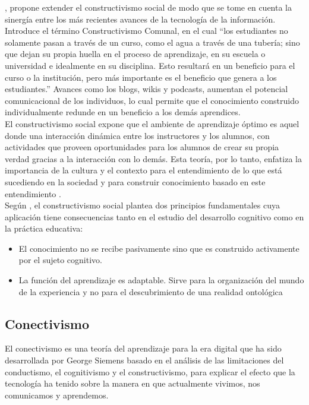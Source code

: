 \citeauthor{Holmes2001}, propone extender el constructivismo social de modo que se tome en cuenta la sinergía entre los más recientes avances de la tecnología de la información. Introduce el término Constructivismo Comunal, en el cual ``los estudiantes no solamente pasan a través de un curso, como el agua a través de una tubería; sino que dejan su propia huella en el proceso de aprendizaje, en su escuela o universidad e idealmente en su disciplina. Esto resultará en un beneficio para el curso o la institución, pero más importante es el beneficio que genera a los estudiantes.'' Avances como los blogs, wikis y podcasts, aumentan el potencial comunicacional de los individuos, lo cual permite que el conocimiento construido individualmente redunde en un beneficio a los demás aprendices.\citep{Holmes2001} \\

El constructivismo social expone que el ambiente de aprendizaje óptimo es aquel donde una interacción dinámica entre los instructores y los alumnos, con actividades que proveen oportunidades para los alumnos de crear su propia verdad gracias a la interacción con lo demás. Esta teoría, por lo tanto, enfatiza la importancia de la cultura y el contexto para el entendimiento de lo que está sucediendo en la sociedad y para construir conocimiento basado en este entendimiento \citep{Carretero1997}. \\

Según \citeauthor{Glasersfeld1989}, el constructivismo social plantea dos principios fundamentales cuya aplicación tiene consecuencias tanto en el estudio del desarrollo cognitivo como en la práctica educativa:

\begin{itemize}
	\item El conocimiento no se recibe pasivamente sino que es construido activamente por el sujeto cognitivo.
	\item La función del aprendizaje es adaptable. Sirve para la organización del mundo de la experiencia y no para el descubrimiento de una realidad ontológica \citep{Glasersfeld1989}
\end{itemize}

\subsection{Conectivismo}
El conectivismo es una teoría del aprendizaje para la era digital que ha sido desarrollada por George Siemens basado en el análisis de las limitaciones del conductismo, el cognitivismo y el constructivismo, para explicar el efecto que la tecnología ha tenido sobre la manera en que actualmente vivimos, nos comunicamos y aprendemos. \citep{Conectivismo_Siemens2004}\\


